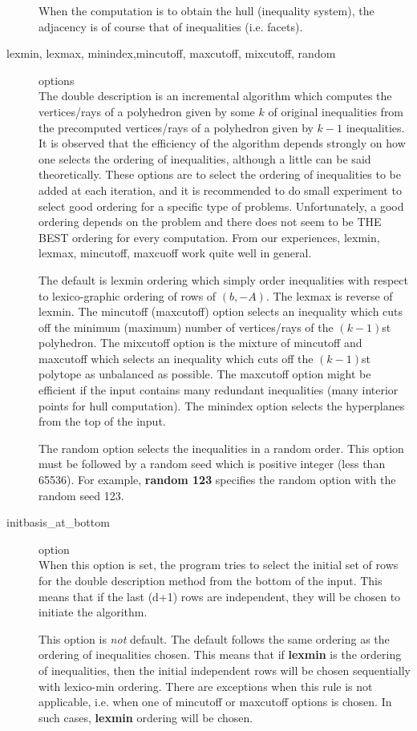 \begin{description}
When the computation is to obtain the hull (inequality system),
the adjacency is of course that of inequalities (i.e. facets).

\item[lexmin, lexmax, minindex,mincutoff, maxcutoff, mixcutoff, random] options\\
The double description is an incremental algorithm which
computes the vertices/rays of a polyhedron given by some $k$ of
original inequalities from the precomputed vertices/rays of a
polyhedron given by $k-1$ inequalities.  It is observed that
the efficiency of the algorithm depends strongly on how
one selects the ordering of inequalities, although a little
can be said theoretically.
These options are to select the ordering of inequalities to be
added at each iteration, and it is recommended to do small
experiment to select good ordering for a specific type of problems.
Unfortunately, a good ordering depends on the problem and there does not seem 
to be THE BEST ordering for every computation.  From our experiences,
lexmin, lexmax, mincutoff, maxcuoff work quite well in general.

The default is lexmin ordering which simply order inequalities
with respect to lexico-graphic ordering of rows of $(b, -A)$.  The lexmax
is reverse of lexmin.  The mincutoff (maxcutoff) option selects an inequality which
cuts off the minimum (maximum) number of vertices/rays of the $(k-1)$st polyhedron. 
The mixcutoff option is the mixture of mincutoff and maxcutoff which selects
an inequality which cuts off the $(k-1)$st polytope as unbalanced as possible.
The maxcutoff option might be efficient if the input contains
many redundant inequalities (many interior points for hull computation).
The minindex option selects the hyperplanes from the top of
the input.

The random option selects the inequalities in a random order.  This option
must be followed by a random seed which is positive integer (less than
65536).  For example, {\bf random 123} specifies the random option with
the random seed 123. 

\item[initbasis\_at\_bottom] option\\
When this option is set, the program tries to select
the initial set of rows for the double description
method from the bottom of the input.  This means that
if the last (d+1) rows are independent, 
they will be chosen to initiate the algorithm.

This option is {\em not\/} default. The default
follows the same ordering as the ordering
of inequalities chosen.  This means that if {\bf lexmin\/}
is the ordering of inequalities, then the initial 
independent rows
will be chosen sequentially with lexico-min ordering.
There are exceptions when this rule
is not applicable, i.e. when one of mincutoff or maxcutoff
options is chosen. In such cases, {\bf lexmin\/}
ordering will be chosen.


\end{description}
